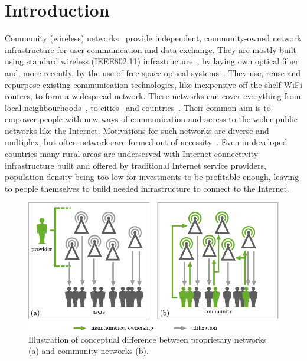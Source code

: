 \documentclass[5p,sort&compress]{elsarticle}
\begin{document}
\section{Introduction}

Community (wireless) networks~\cite{Bruno_2005,Frangoudis_2011} provide independent, community-owned network infrastructure for user communication and data exchange.
They are mostly built using standard wireless (IEEE802.11) infrastructure~\cite{Akyildiz_2005}, by laying own optical fiber and, more recently, by the use of free-space optical systems~\cite{Mustafa_2013}.
They use, reuse and repurpose existing communication technologies, like inexpensive off-the-shelf WiFi routers, to form a widespread network.
These networks can cover everything from local neighbourhoods~\cite{RedHook_2013}, to cities~\cite{AWMN} and countries~\cite{wlanslovenija_2009, guifi_2003, Funkfeuer_2003, Freifunk_2003}.
Their common aim is to empower people with new ways of communication and access to the wider public networks like the Internet.
Motivations for such networks are diverse and multiplex, but often networks are formed out of necessity~\cite{WNDW_2013}.
Even in developed countries many rural areas are underserved with Internet connectivity infrastructure built and offered by traditional Internet service providers, population density being too low for investments to be profitable enough, leaving to people themselves to build needed infrastructure to connect to the Internet.

\begin{figure}[t]
  \centering
  \includegraphics[width=\columnwidth]{figures/community.pdf}
  \caption{Illustration of conceptual difference between proprietary networks (a) and community networks (b).}
  \label{fig:community}
\end{figure}
\end{document}
